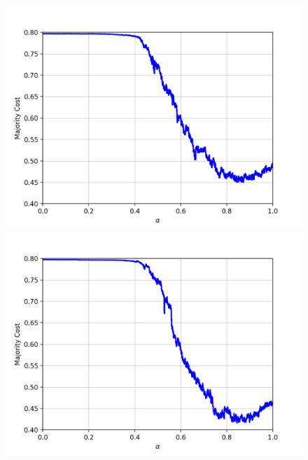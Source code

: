 \begin{figure}[h]
\centering
\begin{minipage}{.3\textwidth}
  \centering
  \includegraphics[width=\linewidth]{plots/mnist-sc-0}
\end{minipage}
\begin{minipage}{.3\textwidth}
  \centering
  \includegraphics[width=\linewidth]{plots/mnist-sc-1}
\end{minipage}
\begin{minipage}{.3\textwidth}
  \centering

\end{minipage}
\end{figure}
